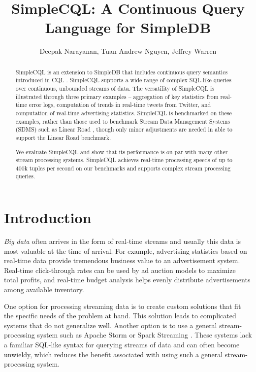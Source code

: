 \documentclass[a4paper, 10pt, conference]{IEEEconf}
\title{\LARGE \bf SimpleCQL: A Continuous Query Language for SimpleDB}
\author{Deepak Narayanan, Tuan Andrew Nguyen, Jeffrey Warren}
\begin{document}
\maketitle
\thispagestyle{empty}
\pagestyle{empty}


\begin{abstract}

SimpleCQL is an extension to SimpleDB \cite{simpledb} that includes continuous query semantics introduced in CQL \cite{cql}. SimpleCQL supports a wide range of complex SQL-like queries over continuous, unbounded streams of data.  The versatility of SimpleCQL is illustrated through three primary examples -- aggregation of key statistics from real-time error logs, computation of trends in real-time tweets from Twitter, and computation of real-time advertising statistics.  SimpleCQL is benchmarked on these examples, rather than those used to benchmark Stream Data Management Systems (SDMS) such as Linear Road \cite{linear}, though only minor adjustments are needed in able to support the Linear Road benchmark.

We evaluate SimpleCQL and show that its performance is on par with many other stream processing systems.  SimpleCQL achieves real-time processing speeds of up to 400k tuples per second on our benchmarks and supports complex stream processing queries.

\end{abstract}


\section{Introduction}

\textit{Big data} often arrives in the form of real-time streams and usually this data is most valuable at the time of arrival. For example, advertising statistics based on real-time data provide tremendous business value to an advertisement system.  Real-time click-through rates can be used by ad auction models to maximize total profits, and real-time budget analysis helps evenly distribute advertisements among available inventory.

One option for processing streaming data is to create custom solutions that fit the specific needs of the problem at hand.  This solution leads to complicated systems that do not generalize well.  Another option is to use a general stream-processing system such as Apache Storm \cite{storm} or Spark Streaming \cite{spark_streaming}.  These systems lack a familiar SQL-like syntax for querying streams of data and can often become unwieldy, which reduces the benefit associated with using such a general stream-processing system.
\end{document}
